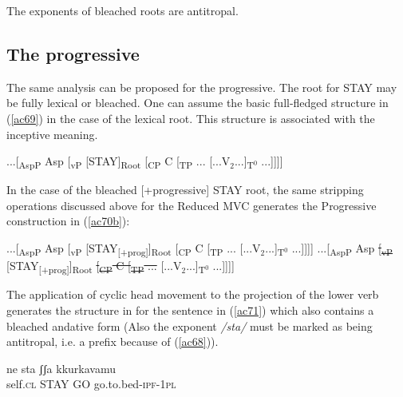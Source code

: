 \documentclass[output=paper]{langscibook}
\begin{document}
\ea\label{ac68}The exponents of bleached roots are antitropal.\z

\subsection{The progressive}

The same analysis can be proposed for the progressive.  The root for STAY may be fully lexical or bleached. One can assume the basic full-fledged structure in (\ref{ac69}) in the case of the lexical root.  This structure is associated with the inceptive meaning.

\ea \label{ac69}...[\textsubscript{AspP} Asp [\textsubscript{vP} [STAY]\textsubscript{Root} [\textsubscript{CP} C [\textsubscript{TP} ... [...V$_2$...]\textsubscript{T$^0$} ...]]]]
\z

In the case of the bleached [+progressive] STAY root, the same stripping operations discussed above for the Reduced MVC generates the Progressive construction in (\ref{ac70b}):

\ea \label{ac70}
    \ea \label{ac70a}...[\textsubscript{AspP} Asp [\textsubscript{vP} [STAY\textsubscript{[+prog]}]\textsubscript{Root} [\textsubscript{CP} C [\textsubscript{TP} ... [...V$_2$...]\textsubscript{T$^0$} ...]]]]
    \ex \label{ac70b}...[\textsubscript{AspP} Asp \sout{[\textsubscript{vP}} [STAY\textsubscript{[+prog]}]\textsubscript{Root} \sout{[\textsubscript{CP} C [\textsubscript{TP} ...} [...V$_2$...]\textsubscript{T$^0$} ...]]]]
    \z
\z

The application of cyclic head movement to the projection of the lower verb generates the structure in  for the sentence in (\ref{ac71}) which also contains a bleached andative form (Also the exponent \textit{/sta/} must be marked as being antitropal, i.e. a prefix because of (\ref{ac68})).

\ea \label{ac71}
    \gll ne     sta    ʃʃa  kkurkavamu\\
   self.\textsc{cl} STAY GO  go.to.bed-\textsc{ipf}-\textsc{1pl}\\
\z
\end{document}
